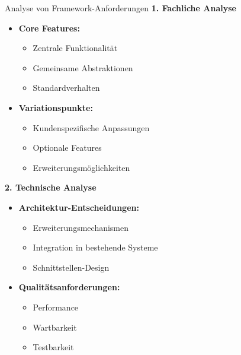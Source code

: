 \begin{KR}{Analyse von Framework-Anforderungen}
\textbf{1. Fachliche Analyse}
\begin{itemize}
    \item \textbf{Core Features:}
    \begin{itemize}
        \item Zentrale Funktionalität
        \item Gemeinsame Abstraktionen
        \item Standardverhalten
    \end{itemize}
    \item \textbf{Variationspunkte:}
    \begin{itemize}
        \item Kundenspezifische Anpassungen
        \item Optionale Features
        \item Erweiterungsmöglichkeiten
    \end{itemize}
\end{itemize}

\textbf{2. Technische Analyse}
\begin{itemize}
    \item \textbf{Architektur-Entscheidungen:}
    \begin{itemize}
        \item Erweiterungsmechanismen
        \item Integration in bestehende Systeme
        \item Schnittstellen-Design
    \end{itemize}
    \item \textbf{Qualitätsanforderungen:}
    \begin{itemize}
        \item Performance
        \item Wartbarkeit
        \item Testbarkeit
    \end{itemize}
\end{itemize}
\end{KR}

